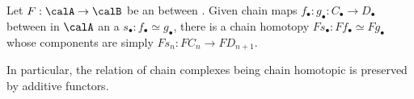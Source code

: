 \begin{lemma} \label{lemma:chain_homotopic_chain_complexes_in_additive_categories_are_preserved_by_additive_functors}
    Let $F: \calA \to \calB$ be an  between .
    Given chain maps $f_\bullet: g_\bullet: C_\bullet \to D_\bullet$ between  in $\calA$ an a  $s_\bullet: f_\bullet \simeq g_\bullet$, there is a chain homotopy $Fs_\bullet: Ff_\bullet \simeq Fg_\bullet$ whose components are simply $Fs_n: FC_n \to FD_{n+1}$. 

    In particular, the relation of chain complexes being chain homotopic is preserved by additive functors.
\end{lemma}